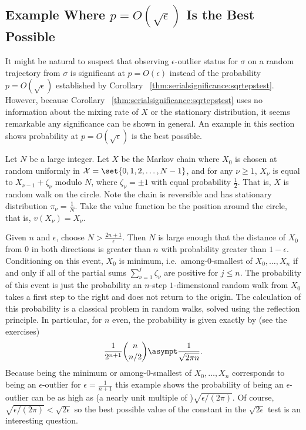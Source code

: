 \documentclass[12pt]{article}
\begin{document}
\subsection*{Example Where \( p = O(\sqrt{\epsilon}) \) Is the Best
Possible}

It might be natural to suspect that observing \( \epsilon \)-outlier
status for \( \sigma \) on a random trajectory from \( \sigma \) is
significant at \( p = O(\epsilon) \) instead of the probability \( p = O
(\sqrt{\epsilon}) \) established by Corollary~%
\ref{thm:serialsignificance:sqrtepstest}.  However, because Corollary~%
\ref{thm:serialsignificance:sqrtepstest} uses no information about the
mixing rate of \( X \) or the stationary distribution, it seems
remarkable any significance can be shown in general.  An example in this
section shows probability at \( p = O( \sqrt{\epsilon}) \) is the best
possible.

Let \( N \) be a large integer.  Let \( X \) be the Markov chain where \(
X_0 \) is chosen at random uniformly in \( \mathcal{X} = \set{0, 1, 2,
\dots , N-1} \), and for any \( \nu \ge 1 \), \( X_{\nu} \) is equal to \(
X_{\nu-1} + \zeta_{\nu} \) modulo \( N \), where \( \zeta_{\nu} = \pm 1 \)
with equal probability \( \frac{1}{2} \).  That is, \( X \) is random
walk on the circle.  Note the chain is reversible and has stationary
distribution \( \pi_\nu = \frac{1}{N} \). %
Take the value function be the position around the circle, that is, \( v
(X_{\nu}) = X_{\nu} \). %

Given \( n \) and \( \epsilon \), choose \( N > \frac{2n+1}{\epsilon} \).
Then \( N \) is large enough that the distance of \( X_0 \) from \( 0 \)
in both directions is greater than \( n \) with probability greater than
\( 1 - \epsilon \).  Conditioning on this event, \( X_0 \) is minimum,
i.e.\ among-0-smallest of \( X_0, \dots , X_n \) if and only if all of
the partial sums \( \sum\limits_{\nu=1}^ {j} \zeta_\nu \) are positive
for \( j \le n \). The probability of this event is just the probability
an \( n \)-step \( 1 \)-dimensional random walk from \( X_0 \) takes a
first step to the right and does not return to the origin.  The
calculation of this probability is a classical problem in random walks,
solved using the reflection principle.  In particular, for \( n \) even,
the probability is given exactly by (see the exercises)
\[
    \frac{1}{2^{n+1}}\binom{n}{n/2} \asympt \frac{1}{\sqrt{2 \pi n}}.
\] Because being the minimum or among-0-smallest of \( X_0, \dots , X_n \)
corresponds to being an \( \epsilon \)-outlier for \( \epsilon = \frac{1}
{n+1} \) this example shows the probability of being an \( \epsilon \)-outlier
can be as high as (a nearly unit multiple of )\( \sqrt{\epsilon/(2\pi)} \).
Of course, \( \sqrt{\epsilon/ (2\pi)} < \sqrt{2\epsilon} \) so the best
possible value of the constant in the \( \sqrt{2\epsilon} \) test is an
interesting question.
\end{document}
